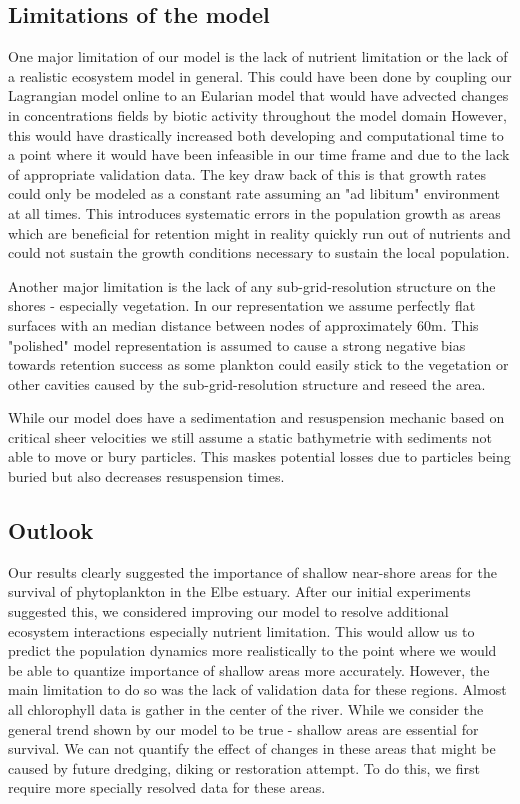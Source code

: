 \subsection*{Limitations of the model}

One major limitation of our model is the lack of nutrient limitation or the lack of a realistic ecosystem model in general.
This could have been done by coupling our Lagrangian model online to an Eularian model that would have advected changes in concentrations fields by biotic activity throughout the model domain
However, this would have drastically increased both developing and computational time to a point where it would have been infeasible in our time frame and due to the lack of appropriate validation data.
The key draw back of this is that growth rates could only be modeled as a constant rate assuming an "ad libitum" environment at all times.
This introduces systematic errors in the population growth as areas which are beneficial for retention might in reality quickly run out of nutrients and could not sustain the growth conditions necessary to sustain the local population.

Another major limitation is the lack of any sub-grid-resolution structure on the shores - especially vegetation.
In our representation we assume perfectly flat surfaces with an median distance between nodes of approximately 60m.
This "polished" model representation is assumed to cause a strong negative bias towards retention success as some plankton could easily stick to the vegetation or other cavities caused by the sub-grid-resolution structure and reseed the area.

While our model does have a sedimentation and resuspension mechanic based on critical sheer velocities we still assume a static bathymetrie with sediments not able to move or bury particles. 
This maskes potential losses due to particles being buried but also decreases resuspension times.

\subsection*{Outlook}

Our results clearly suggested the importance of shallow near-shore areas for the survival of phytoplankton in the Elbe estuary.
After our initial experiments suggested this, we considered improving our model to resolve additional ecosystem interactions especially nutrient limitation.
This would allow us to predict the population dynamics more realistically to the point where we would be able to quantize importance of shallow areas more accurately.
However, the main limitation to do so was the lack of validation data for these regions. 
Almost all chlorophyll data is gather in the center of the river.
While we consider the general trend shown by our model to be true - shallow areas are essential for survival. We can not quantify the effect of changes in these areas that might be caused by future dredging, diking or restoration attempt.
To do this, we first require more specially resolved data for these areas.

